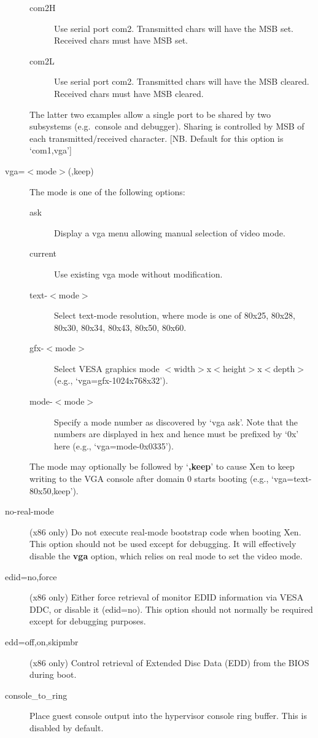 \documentclass[11pt,twoside,final,openright]{report}
\begin{document}
\begin{description}
\begin{description}
  \item[ com2H ] Use serial port com2. Transmitted chars will have the
    MSB set. Received chars must have MSB set.
  \item[ com2L] Use serial port com2. Transmitted chars will have the
    MSB cleared. Received chars must have MSB cleared.
  \end{description}
  The latter two examples allow a single port to be shared by two
  subsystems (e.g.\ console and debugger). Sharing is controlled by
  MSB of each transmitted/received character.  [NB. Default for this
  option is `com1,vga']
\item [ vga=$<$mode$>$(,keep) ] The mode is one of the following options:
  \begin{description}
  \item[ ask ] Display a vga menu allowing manual selection of video
  mode.
  \item[ current ] Use existing vga mode without modification.
  \item[ text-$<$mode$>$ ] Select text-mode resolution, where mode is
  one of 80x25, 80x28, 80x30, 80x34, 80x43, 80x50, 80x60.
  \item[ gfx-$<$mode$>$ ] Select VESA graphics mode
  $<$width$>$x$<$height$>$x$<$depth$>$ (e.g., `vga=gfx-1024x768x32').
  \item[ mode-$<$mode$>$ ] Specify a mode number as discovered by `vga
  ask'. Note that the numbers are displayed in hex and hence must be
  prefixed by `0x' here (e.g., `vga=mode-0x0335').
  \end{description}
The mode may optionally be followed by `{\bf,keep}' to cause Xen to keep
writing to the VGA console after domain 0 starts booting (e.g., `vga=text-80x50,keep').
\item [ no-real-mode ] (x86 only) Do not execute real-mode bootstrap
  code when booting Xen. This option should not be used except for
  debugging. It will effectively disable the {\bf vga} option, which
  relies on real mode to set the video mode.
\item [ edid=no,force ] (x86 only) Either force retrieval of monitor
  EDID information via VESA DDC, or disable it (edid=no). This option
  should not normally be required except for debugging purposes.
\item [ edd=off,on,skipmbr ] (x86 only) Control retrieval of Extended
  Disc Data (EDD) from the BIOS during boot.
\item [ console\_to\_ring ] Place guest console output into the
  hypervisor console ring buffer. This is disabled by default.

\end{description}
\end{document}
